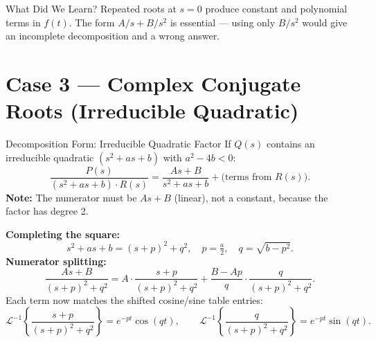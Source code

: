 \documentclass[12pt,a4paper]{article}
\begin{document}
\begin{learnbox}{What Did We Learn?}
Repeated roots at $s=0$ produce constant and polynomial terms in $f(t)$.
The form $A/s + B/s^2$ is essential --- using only $B/s^2$ would give an
incomplete decomposition and a wrong answer.
\end{learnbox}

\section{Case 3 --- Complex Conjugate Roots (Irreducible Quadratic)}
\begin{infobox}{Decomposition Form: Irreducible Quadratic Factor}
If $Q(s)$ contains an irreducible quadratic $(s^2+as+b)$ with $a^2-4b<0$:
\[
  \frac{P(s)}{(s^2+as+b)\cdot R(s)} = \frac{As+B}{s^2+as+b}
  + \text{(terms from }R(s)\text{)}.
\]
\textbf{Note:} The numerator must be $As+B$ (linear), not a constant,
because the factor has degree 2.

\textbf{Completing the square:}
\[
  s^2 + as + b = (s+p)^2 + q^2,\quad p = \tfrac{a}{2},\quad
  q = \sqrt{b - p^2}.
\]
\textbf{Numerator splitting:}
\[
  \frac{As+B}{(s+p)^2+q^2}
  = A\cdot\frac{s+p}{(s+p)^2+q^2}
  + \frac{B-Ap}{q}\cdot\frac{q}{(s+p)^2+q^2}.
\]
Each term now matches the shifted cosine/sine table entries:
\[
  \mathcal{L}^{-1}\!\left\{\frac{s+p}{(s+p)^2+q^2}\right\}=e^{-pt}\cos(qt),\qquad
  \mathcal{L}^{-1}\!\left\{\frac{q}{(s+p)^2+q^2}\right\}=e^{-pt}\sin(qt).
\]
\end{infobox}
\end{document}
